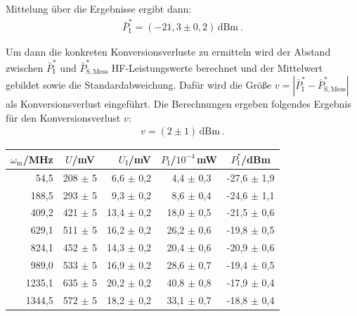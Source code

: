 Mittelung über die Ergebnisse ergibt dann:
\begin{gather}
    \boxed{\bar{P}_\mathrm{I}^* = (- 21,3 \pm 0,2)\,\mathrm{dBm}}~.
\end{gather}

Um dann die konkreten Konversionsverluste zu ermitteln wird der Abstand zwischen $\bar{P}^*_\mathrm{I}$ und $\bar{P}^*_\mathrm{S,Mess}$ HF-Leistungswerte berechnet und der Mittelwert gebildet sowie die Standardabweichung. Dafür wird die Größe $v = |\bar{P}^*_\mathrm{I} - \bar{P}^*_\mathrm{S,Mess}|$ als Konversionsverlust eingeführt. Die Berechnungen ergeben folgendes Ergebnis für den Konversionsverlust $v$:
\begin{gather}
    \boxed{v = (2 \pm 1)\,\mathrm{dBm}}~.
\end{gather}

\begin{center}
    \captionsetup{type=table}
    \begin{tabular}{r | c r | c c }
        $\omega_\mathrm{m}$/MHz & $U$/mV & $U_\mathrm{I}$/mV & $P_\mathrm{I}$/$10^{-4}$\,mW & $P^*_\mathrm{I}$/dBm \\ \hline
        54,5   & 208 $\pm$ 5 & 6,6  $\pm$ 0,2 & ~4,4 $\pm$ 0,3 & -27,6 $\pm$ 1,9 \\
        188,5  & 293 $\pm$ 5 & 9,3  $\pm$ 0,2 & ~8,6 $\pm$ 0,4 & -24,6 $\pm$ 1,1 \\
        409,2  & 421 $\pm$ 5 & 13,4 $\pm$ 0,2 & 18,0 $\pm$ 0,5 & -21,5 $\pm$ 0,6 \\
        629,1  & 511 $\pm$ 5 & 16,2 $\pm$ 0,2 & 26,2 $\pm$ 0,6 & -19,8 $\pm$ 0,5 \\
        824,1  & 452 $\pm$ 5 & 14,3 $\pm$ 0,2 & 20,4 $\pm$ 0,6 & -20,9 $\pm$ 0,6 \\
        989,0  & 533 $\pm$ 5 & 16,9 $\pm$ 0,2 & 28,6 $\pm$ 0,7 & -19,4 $\pm$ 0,5 \\
        1235,1 & 635 $\pm$ 5 & 20,2 $\pm$ 0,2 & 40,8 $\pm$ 0,8 & -17,9 $\pm$ 0,4 \\
        1344,5 & 572 $\pm$ 5 & 18,2 $\pm$ 0,2 & 33,1 $\pm$ 0,7 & -18,8 $\pm$ 0,4 \\
    \end{tabular}
    \label{tab:konversionsverluste}
\end{center}

\newpage

